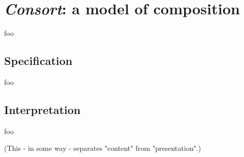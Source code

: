 \chapter{\emph{Consort}: a model of composition}

foo

\section{Specification}

foo

\section{Interpretation}

foo

(This - in some way - separates "content" from "presentation".)
